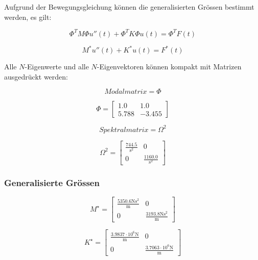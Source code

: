 \documentclass[
  letterpaper,
  DIV=11]{scrreprt}
\begin{document}
Aufgrund der Bewegungsgleichung können die generalisierten Grössen
bestimmt werden, es gilt:

\[\Phi^T M \Phi u''(t) + \Phi^T K \Phi u(t) = \Phi^T F(t)\]

\[M^*u''(t) + K^* u(t) = F^* (t)\]

Alle \(N\)-Eigenwerte und alle \(N\)-Eigenvektoren können kompakt mit
Matrizen ausgedrückt werden:

\begin{equation*}Modalmatrix = \Phi\end{equation*}

\begin{equation*}\Phi = \left[\begin{matrix}1.0 & 1.0\\5.788 & -3.455\end{matrix}\right]\end{equation*}

\begin{equation*}Spektralmatrix = \Omega^{2}\end{equation*}

\begin{equation*}\Omega^{2} = \left[\begin{matrix}\frac{744.5}{\text{s}^{2}} & 0\\0 & \frac{1160.0}{\text{s}^{2}}\end{matrix}\right]\end{equation*}

\hypertarget{generalisierte-gruxf6ssen}{%
\subsubsection{Generalisierte Grössen}\label{generalisierte-gruxf6ssen}}

\begin{equation*}M^{\star} = \left[\begin{matrix}\frac{5350.6 \text{N} \text{s}^{2}}{\text{m}} & 0\\0 & \frac{3193.8 \text{N} \text{s}^{2}}{\text{m}}\end{matrix}\right]\end{equation*}

\begin{equation*}K^{\star} = \left[\begin{matrix}\frac{3.9837 \cdot 10^{6} \text{N}}{\text{m}} & 0\\0 & \frac{3.7063 \cdot 10^{6} \text{N}}{\text{m}}\end{matrix}\right]\end{equation*}
\end{document}
